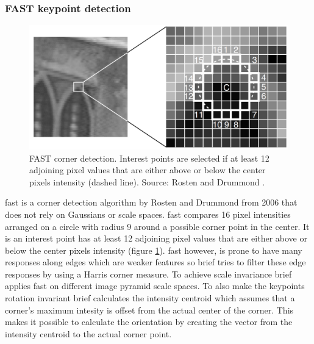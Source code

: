 \subsubsection*{FAST keypoint detection}
\begin{figure}[ht]
	\centering
	\includegraphics[scale=0.3]{figures/theoryFAST_corners}
	\caption{FAST corner detection. Interest points are selected if at least 12 adjoining pixel values that are either above or below the center pixels intensity {(dashed line)}. Source: Rosten and Drummond \cite{Rosten}.}
	\label{fig:fastCorners}
\end{figure}
\gls{fast} is a corner detection algorithm by Rosten and Drummond from 2006 that does not rely on Gaussians or scale spaces. \gls{fast} compares 16 pixel intensities arranged on a circle with radius 9 around a possible corner point in the center. It is an interest point has at least 12 adjoining pixel values that are either above or below the center pixels intensity {(figure \ref{fig:fastCorners})}. \gls{fast} however, is prone to have many responses along edges which are weaker features so \gls{brief} tries to filter these edge responses by using a Harris corner measure. To achieve scale invariance \gls{brief} applies \gls{fast} on different image pyramid scale spaces. To also make the keypoints rotation invariant \gls{brief} calculates the intensity centroid which assumes that a corner's maximum intesity is offset from the actual center of the corner. This makes it possible to calculate the orientation by creating the vector from the intensity centroid to the actual corner point.

